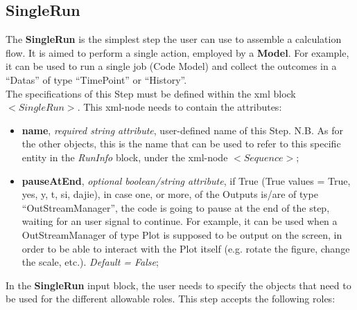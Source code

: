\subsection{SingleRun}
\label{subsec:stepSingleRun}
The  \textbf{SingleRun} is the simplest step the user can use to assemble a calculation flow. It is aimed to perform a single  action, employed by a \textbf{Model}. For example, it can be used to run a single job (Code Model) and collect the outcomes in a ``Datas'' of type ``TimePoint'' or ``History''.
\\ The specifications of this Step must be defined within the xml block $<SingleRun>$. This xml-node needs to contain the attributes:
\vspace{-5mm}
\begin{itemize}
\itemsep0em
\item \textbf{name}, \textit{required string attribute}, user-defined name of this Step. N.B. As for the other objects, this is the name that can be used to refer to this specific entity in the \textit{RunInfo} block, under the xml-node $<Sequence>$;
\item \textbf{pauseAtEnd}, \textit{optional boolean/string attribute}, if True (True values = True, yes, y, t, si, dajie), in case one, or more, of the Outputs is/are of type ``OutStreamManager'', the code is going to pause at the end of the step, waiting for an user signal to continue. For example, it can be used when a OutStreamManager of type Plot is supposed to be output on the screen, in order to be able to interact with the Plot itself (e.g. rotate the figure, change the scale, etc.).  \textit{Default = False};
\end{itemize}
\vspace{-5mm}
In the \textbf{SingleRun} input block, the user needs to specify the objects that need to be used for the different allowable roles. This step accepts the following roles:
